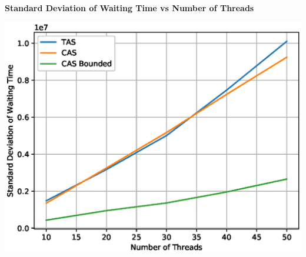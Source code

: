 \documentclass[a4paper,12pt]{report}
\begin{document}
\newpage
\begin{center}
\begin{large}
\textbf{Standard Deviation of Waiting Time vs Number of Threads}
\end{large}
\includegraphics{sd.eps}
\end{center}
\newpage
\end{document}

